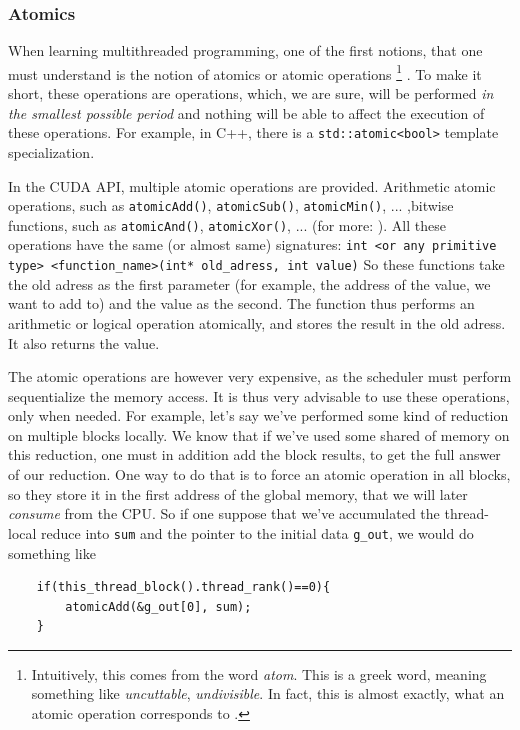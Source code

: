 \subsubsection*{Atomics}
When learning multithreaded programming, one of the first notions, that one must understand
is the notion of atomics or atomic operations \footnote{Intuitively, 
this comes from the word \textit{atom}. This is a greek word, meaning something 
like \textit{uncuttable}, \textit{undivisible}. In fact, this is almost exactly, what an atomic operation corresponds to 
\cite{atomics} .}
. To make it short, these operations are operations, which, we are sure, will be performed \textit{in the smallest possible
period} and nothing will be able to affect the execution of these operations.
For example, in C++, there is a \verb|std::atomic<bool>| template specialization. 


In the CUDA API, multiple atomic operations are provided. Arithmetic atomic operations, 
such as \verb|atomicAdd()|, \verb|atomicSub()|, \verb|atomicMin()|, ... 
,bitwise functions, such as \verb|atomicAnd()|, \verb|atomicXor()|, ...
(for more: \cite{center}).
All these operations have the same (or almost same) signatures: 
\verb|int <or any primitive type> <function_name>(int* old_adress, int value)|
So these functions take the old adress as the first parameter (for example, the address of the value, we want to add to) and 
the value as the second. The function thus performs an arithmetic or logical operation atomically, 
and stores the result in the old adress. It also returns the value.


The atomic operations are however very expensive, as the scheduler must perform sequentialize the memory access. 
It is thus very advisable to use these operations, only when needed.
For example, let's say we've performed some kind of reduction on multiple blocks locally. 
We know that if we've used some shared of memory on this reduction, one must in addition add the block results, to 
get the full answer of our reduction. One way to do that is to force an atomic operation in all blocks, so they store it 
in the first address of the global memory, that we will later \textit{consume} from the CPU. 
So if one  suppose that we've accumulated the thread-local reduce into \verb|sum| and the pointer to the 
initial data \verb|g_out|, we would do something like

\begin{verbatim}
    if(this_thread_block().thread_rank()==0){
        atomicAdd(&g_out[0], sum);
    }
\end{verbatim}



